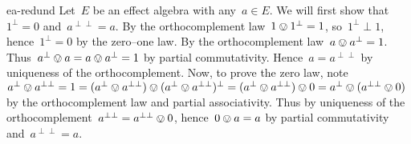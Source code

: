 \begin{solution}{ea-redund}%
Let~$E$ be an effect algebra with any~$a \in E$.
We will first show that~$1^\perp = 0$ and~$a^{\perp\perp} = a$.
By the orthocomplement law~$1 \ovee 1^\perp = 1$,
    so~$1^\perp \perp 1$,
    hence~$1^\perp=0$ by the zero--one law.
By the orthocomplement law~$a \ovee a^\perp = 1$.
Thus~$a^\perp \ovee a = a \ovee a^\perp = 1$ by partial commutativity.
    Hence~$a = a^{\perp\perp}$ by uniqueness of the orthocomplement.
Now, to prove the zero law,
    note~$a^\perp \ovee a^{\perp\perp}
        = 1 = (a^\perp\ovee a^{\perp\perp})
    \ovee (a^\perp \ovee a^{\perp\perp})^\perp
    = (a^\perp \ovee a^{\perp\perp}) \ovee 0 
        = a^\perp \ovee (a^{\perp\perp} \ovee 0)$
    by the orthocomplement law and partial associativity.
Thus by uniqueness of the orthocomplement~$a^{\perp\perp} = a^{\perp\perp} \ovee 0$,
    hence~$0 \ovee a = a$ by partial commutativity and~$a^{\perp\perp} = a$.
\end{solution}
